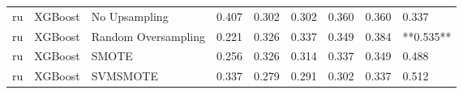 \begin{tabular}{lllllllll}
      ru &                      XGBoost &       No Upsampling &     0.407 &                     0.302 &                 0.302 &                  0.360 &                                   0.360 &     0.337 \\
      ru &                      XGBoost & Random Oversampling &     0.221 &                     0.326 &                 0.337 &                  0.349 &                                   0.384 & **0.535** \\
      ru &                      XGBoost &               SMOTE &     0.256 &                     0.326 &                 0.314 &                  0.337 &                                   0.349 &     0.488 \\
      ru &                      XGBoost &            SVMSMOTE &     0.337 &                     0.279 &                 0.291 &                  0.302 &                                   0.337 &     0.512 \\
\bottomrule
\end{tabular}
